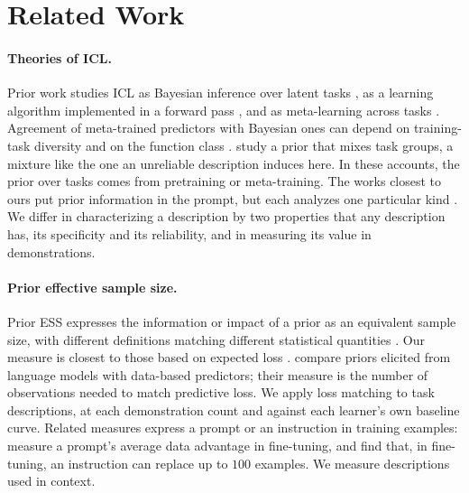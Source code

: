 \documentclass{article}
\theoremstyle{definition}
\begin{document}
\section{Related Work}

\paragraph{Theories of ICL.}
Prior work studies ICL as Bayesian inference over latent tasks \citep{xie2022,panwar2024}, as a learning algorithm implemented in a forward pass \citep{akyurek2023,vonoswald2023}, and as meta-learning across tasks \citep{garg2022,muller2022}. Agreement of meta-trained predictors with Bayesian ones can depend on training-task diversity and on the function class \citep{raventos2023,panwar2024}. \citet{lin2024} study a prior that mixes task groups, a mixture like the one an unreliable description induces here. In these accounts, the prior over tasks comes from pretraining or meta-training. The works closest to ours put prior information in the prompt, but each analyzes one particular kind \citep{huangge2025,lin2025,zhu2026}. We differ in characterizing a description by two properties that any description has, its specificity and its reliability, and in measuring its value in demonstrations.

\paragraph{Prior effective sample size.}
Prior ESS expresses the information or impact of a prior as an equivalent sample size, with different definitions matching different statistical quantities \citep{morita2008,neuenschwander2020}. Our measure is closest to those based on expected loss \citep{reimherr2021,wiesenfarth2020}. \citet{selby2025} compare priors elicited from language models with data-based predictors; their measure is the number of observations needed to match predictive loss. We apply loss matching to task descriptions, at each demonstration count and against each learner's own baseline curve. Related measures express a prompt or an instruction in training examples: \citet{lescao2021} measure a prompt's average data advantage in fine-tuning, and \citet{cook2026} find that, in fine-tuning, an instruction can replace up to $100$ examples. We measure descriptions used in context.
\end{document}
